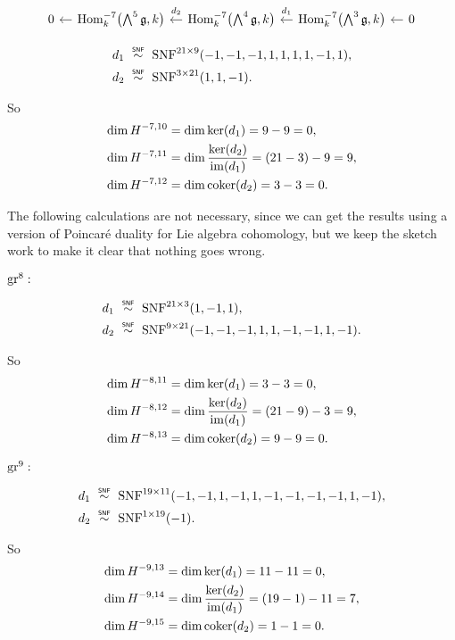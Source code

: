 \[
  \begin{tikzcd}[column sep=1em]
    0 & \ar[l] \Hom_{k}^{-7}\bigl( \bigwedge^{5}\lie{g}, k \bigr) & \ar[l,"d_{2}"' {yshift=2pt}] \Hom_{k}^{-7}\bigl( \bigwedge^{4}\lie{g}, k \bigr) & \ar[l,"d_{1}"' {yshift=2pt}] \Hom_{k}^{-7}\bigl( \bigwedge^{3}\lie{g}, k \bigr) & \ar[l] 0
  \end{tikzcd}
\]

\begin{align*}
  d_{1} &\snfsim \SNF^{21\times9}(-1,-1,-1,1,1,1,1,-1,1), \\
  d_{2} &\snfsim \SNF^{3\times21}(1,1,-1).
\end{align*}

So
\begin{align*}
  \dim H^{-7,10} &= \dim \operatorname{ker}(d_{1}) = 9-9 = 0, \\
  \dim H^{-7,11} &= \dim \dfrac{\operatorname{ker}(d_{2})}{\operatorname{im}(d_{1})} = (21-3) - 9 = 9, \\
  \dim H^{-7,12} &= \dim \operatorname{coker}(d_{2}) = 3 - 3 = 0.
\end{align*}

The following calculations are not necessary, since we can get the results using a version of Poincaré duality for Lie algebra cohomology, but we keep the sketch work to make it clear that nothing goes wrong.

$\operatorname{gr}^{8}:$

\begin{align*}
  d_{1} &\snfsim \SNF^{21\times3}(1,-1,1), \\
  d_{2} &\snfsim \SNF^{9\times21}(-1,-1,-1,1,1,-1,-1,1,-1).
\end{align*}

So
\begin{align*}
  \dim H^{-8,11} &= \dim \operatorname{ker}(d_{1}) = 3-3 = 0, \\
  \dim H^{-8,12} &= \dim \dfrac{\operatorname{ker}(d_{2})}{\operatorname{im}(d_{1})} = (21-9) - 3 = 9, \\
  \dim H^{-8,13} &= \dim \operatorname{coker}(d_{2}) = 9 - 9 = 0.
\end{align*}


$\operatorname{gr}^{9}:$

\begin{align*}
  d_{1} &\snfsim \SNF^{19\times11}(-1,-1,1,-1,1,-1,-1,-1,-1,1,-1), \\
  d_{2} &\snfsim \SNF^{1\times19}(-1).
\end{align*}

So
\begin{align*}
  \dim H^{-9,13} &= \dim \operatorname{ker}(d_{1}) = 11-11 = 0, \\
  \dim H^{-9,14} &= \dim \dfrac{\operatorname{ker}(d_{2})}{\operatorname{im}(d_{1})} = (19-1) - 11 = 7, \\
  \dim H^{-9,15} &= \dim \operatorname{coker}(d_{2}) = 1 - 1 = 0.
\end{align*}

